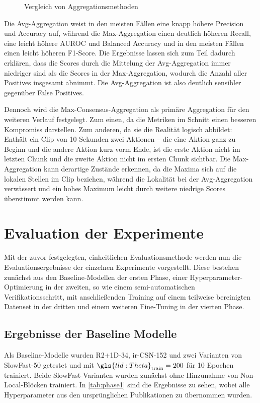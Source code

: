 \begin{figure}[htbp!]
\begin{subfigure}{.33\textwidth}
    \end{subfigure}
    \caption{Vergleich von Aggregationsmethoden}
    \label{fig:consensus}
\end{figure}

Die Avg-Aggregation weist in den meisten Fällen eine knapp höhere Precision und Accuracy auf, während die Max-Aggregation einen deutlich höheren Recall, eine leicht höhere AUROC und Balanced Accuracy und in den meisten Fällen einen leicht höheren F1-Score.
Die Ergebnisse lassen sich zum Teil dadurch erklären, dass die Scores durch die Mittelung der Avg-Aggregation immer niedriger sind als die Scores in der Max-Aggregation, wodurch die Anzahl aller Positives insgesamt abnimmt.
Die Avg-Aggregation ist also deutlich sensibler gegenüber False Positives.

Dennoch wird die Max-Consensus-Aggregation als primäre Aggregation für den weiteren Verlauf festgelegt.
Zum einen, da die Metriken im Schnitt einen besseren Kompromiss darstellen.
Zum anderen, da sie die Realität logisch abbildet:
Enthält ein Clip von 10 Sekunden zwei Aktionen -- die eine Aktion ganz zu Beginn und die andere Aktion kurz vorm Ende, ist die erste Aktion nicht im letzten Chunk und die zweite Aktion nicht im ersten Chunk sichtbar.
Die Max-Aggregation kann derartige Zustände erkennen, da die Maxima sich auf die lokalen Stellen im Clip beziehen, während die Lokalität bei der Avg-Aggregation verwässert und ein hohes Maximum leicht durch weitere niedrige Scores überstimmt werden kann.

\section{Evaluation der Experimente}

Mit der zuvor festgelegten, einheitlichen Evaluationsmethode werden nun die Evaluationsergebnisse der einzelnen Experimente vorgestellt.
Diese bestehen zunächst aus den Baseline-Modellen der ersten Phase, einer Hyperparameter-Optimierung in der zweiten, so wie einem semi-automatischen Verifikationsschritt, mit anschließenden Training auf einem teilweise bereinigten Datenset in der dritten und einem weiteren Fine-Tuning in der vierten Phase.

\subsection{Ergebnisse der Baseline Modelle}

Als Baseline-Modelle wurden R2+1D-34, ir-CSN-152 und zwei Varianten von SlowFast-50 getestet und mit $\gls{tld:Theta}_\text{train} = 200$ für 10 Epochen trainiert.
Beide SlowFast-Varianten wurden zunächst ohne Hinzunahme von Non-Local-Blöcken trainiert.
In \autoref{tab:phase1} sind die Ergebnisse zu sehen, wobei alle Hyperparameter aus den ursprünglichen Publikationen zu übernommen wurden.

